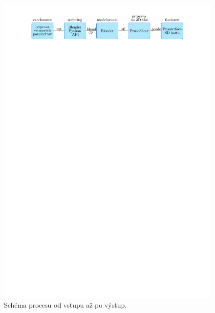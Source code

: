 \begin{figure}[h]
	\centering
	\includegraphics[trim={2.8cm 26cm 0cm 1cm},clip]{images/pipeline3.pdf}
	\caption[Schéma procesu.]{Schéma procesu od vstupu až po výstup.}
	\label{fig:pipeline}
\end{figure}

